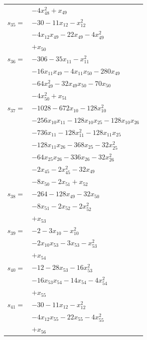 \begin{longtable}{@{}r@{\;}l@{}}
 & \(\displaystyle -4x_{48}^{2} +x_{49}\) \\[3pt]
\(s_{35}=\) & \(\displaystyle -30 -11x_{12} -x_{12}^{2}\) \\
 & \(\displaystyle -4x_{12}x_{49} -22x_{49} -4x_{49}^{2}\) \\
 & \(\displaystyle +x_{50}\) \\[3pt]
\(s_{36}=\) & \(\displaystyle -306 -35x_{11} -x_{11}^{2}\) \\
 & \(\displaystyle -16x_{11}x_{49} -4x_{11}x_{50} -280x_{49}\) \\
 & \(\displaystyle -64x_{49}^{2} -32x_{49}x_{50} -70x_{50}\) \\
 & \(\displaystyle -4x_{50}^{2} +x_{51}\) \\[3pt]
\(s_{37}=\) & \(\displaystyle -1028 -672x_{10} -128x_{10}^{2}\) \\
 & \(\displaystyle -256x_{10}x_{11} -128x_{10}x_{25} -128x_{10}x_{26}\) \\
 & \(\displaystyle -736x_{11} -128x_{11}^{2} -128x_{11}x_{25}\) \\
 & \(\displaystyle -128x_{11}x_{26} -368x_{25} -32x_{25}^{2}\) \\
 & \(\displaystyle -64x_{25}x_{26} -336x_{26} -32x_{26}^{2}\) \\
 & \(\displaystyle -2x_{45} -2x_{45}^{2} -32x_{49}\) \\
 & \(\displaystyle -8x_{50} -2x_{51} +x_{52}\) \\[3pt]
\(s_{38}=\) & \(\displaystyle -264 -128x_{49} -32x_{50}\) \\
 & \(\displaystyle -8x_{51} -2x_{52} -2x_{52}^{2}\) \\
 & \(\displaystyle +x_{53}\) \\[3pt]
\(s_{39}=\) & \(\displaystyle -2 -3x_{10} -x_{10}^{2}\) \\
 & \(\displaystyle -2x_{10}x_{53} -3x_{53} -x_{53}^{2}\) \\
 & \(\displaystyle +x_{54}\) \\[3pt]
\(s_{40}=\) & \(\displaystyle -12 -28x_{53} -16x_{53}^{2}\) \\
 & \(\displaystyle -16x_{53}x_{54} -14x_{54} -4x_{54}^{2}\) \\
 & \(\displaystyle +x_{55}\) \\[3pt]
\(s_{41}=\) & \(\displaystyle -30 -11x_{12} -x_{12}^{2}\) \\
 & \(\displaystyle -4x_{12}x_{55} -22x_{55} -4x_{55}^{2}\) \\
 & \(\displaystyle +x_{56}\) \\[3pt]

\end{longtable}
